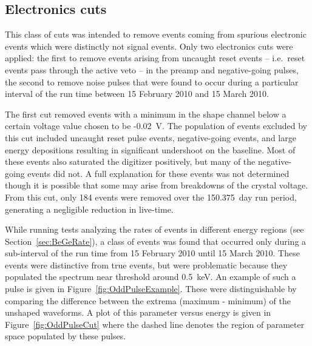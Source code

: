 	
		\subsection{Electronics cuts}
		\label{sec:BeGeElecCuts}
	
	This class of cuts was intended to remove events coming from spurious electronic events which were distinctly not signal events.  Only two electronics cuts were applied: the first to remove events arising from uncaught reset events -- i.e.~reset events pass through the active veto -- in the preamp and negative-going pulses, the second to remove noise pulses that were found to occur during a particular interval of the run time between 15 February 2010 and 15 March 2010.  
	
	The first cut removed events with a minimum in the shape channel below a certain voltage value chosen to be -0.02~V.  The population of events excluded by this cut included uncaught reset pulse events, negative-going events, and large energy depositions resulting in significant undershoot on the baseline.  Most of these events also saturated the digitizer positively, but many of the negative-going events did not.  A full explanation for these events was not determined though it is possible that some may arise from breakdowns of the crystal voltage.  From this cut, only 184 events were removed over the 150.375~day run period, generating a negligible reduction in live-time.
	
	While running tests analyzing the rates of events in different energy regions (see Section~\ref{sec:BeGeRate}), a class of events was found that occurred only during a sub-interval of the run time from 15 February 2010 until 15 March 2010.  These events were distinctive from true events, but were problematic because they populated the spectrum near threshold around 0.5~keV.   An example of such a pulse is given in Figure~\ref{fig:OddPulseExample}.  These were distinguishable by comparing the difference between the extrema (maximum - minimum) of the unshaped waveforms.  A plot of this parameter versus energy is given in Figure~\ref{fig:OddPulseCut} where the dashed line denotes the region of parameter space populated by these pulses.  
	
